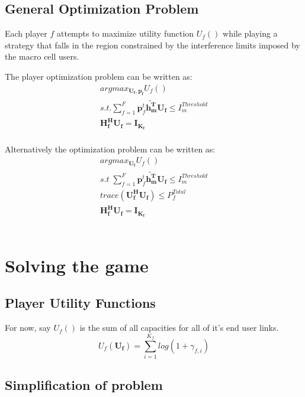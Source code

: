\documentclass[12pt]{article}
\begin{document}
\subsection{General Optimization Problem}

Each player $f$ attempts to maximize utility function $U_f()$ while playing a strategy that falls in the region constrained by the interference limits imposed by the macro cell users.

The player optimization problem can be written as:
\\

\begin{gather*} 
argmax_{\mathbf{U_f,\mathbf{p}_f}} U_f() 
\\
s.t. \sum^F_{f=1} \mathbf{p}_f^t \mathbf{\tilde{h_m^T}}  \mathbf{U_f}  \leq I^{Threshold}_{m} 
\\
\mathbf{H_f^H}\mathbf{U_f} = \mathbf{I_{K_f}}
\end{gather*}
\\

Alternatively the optimization problem can be written as:
\\
\begin{gather} 
argmax_{\mathbf{U_f}} U_f()\label{utility}
\\
s.t \; \sum^F_{f=1} \mathbf{p}_f^t \mathbf{\tilde{h_m^T}}  \mathbf{U_f}  \leq I^{Threshold}_{m} \label{interference_contstraint}
\\
trace(\mathbf{U_f^H}\mathbf{U_f}) \leq P^{Total}_{f} \label{power_constraint}
\\
\mathbf{H_f^H}\mathbf{U_f} = \mathbf{I_{K_f}}\label{Zero_Forcing}
\end{gather}
\\


\section{Solving the game}
\subsection{Player Utility Functions}

For now, say $U_f() $ is the sum of all capacities for all of it's end user links. 
\begin{displaymath}
U_f(\mathbf{U_f}) = \sum^{K_f}_{i=1} log(1+\gamma_{f,i})
\end{displaymath}

\subsection{Simplification of problem}
\end{document}
